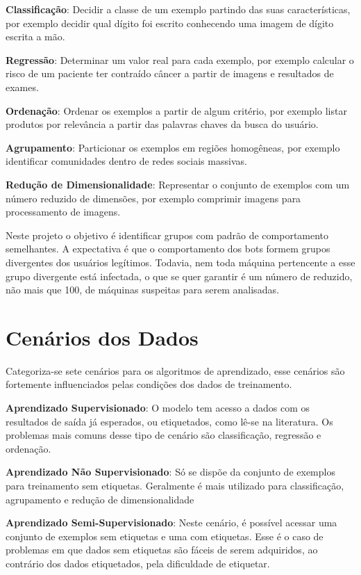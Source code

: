 \begin{description}
\item \textbf{Classificação}: Decidir a classe de um exemplo partindo das suas características, por exemplo decidir qual dígito foi escrito conhecendo uma imagem de dígito escrita a mão.
\item \textbf{Regressão}: Determinar um valor real para cada exemplo, por exemplo calcular o risco de um paciente ter contraído câncer a partir de imagens e resultados de exames.
\item \textbf{Ordenação}: Ordenar os exemplos a partir de algum critério, por exemplo listar produtos por relevância a partir das palavras chaves da busca do usuário.
\item \textbf{Agrupamento}: Particionar os exemplos em regiões homogêneas, por exemplo identificar comunidades dentro de redes sociais massivas.
\item \textbf{Redução de Dimensionalidade}: Representar o conjunto de exemplos com um número reduzido de dimensões, por exemplo comprimir imagens para processamento de imagens.
\end{description}

Neste projeto o objetivo é identificar grupos com padrão de comportamento semelhantes. A expectativa é que o comportamento dos bots formem grupos divergentes dos usuários legítimos. Todavia, nem toda máquina pertencente a esse grupo divergente está infectada, o que se quer garantir é um número de reduzido, não mais que 100, de máquinas suspeitas para serem analisadas.

\section{Cenários dos Dados}

Categoriza-se \citep{mohri2012foundations} sete cenários para os algoritmos de aprendizado, esse cenários são fortemente influenciados pelas condições dos dados de treinamento.

\begin{description}
\item \textbf{Aprendizado Supervisionado}: O modelo tem acesso a dados com os resultados de saída já esperados, ou etiquetados, como lê-se na literatura. Os problemas mais comuns desse tipo de cenário são classificação, regressão e ordenação.

\item \textbf{Aprendizado Não Supervisionado}: Só se dispõe da conjunto de exemplos para treinamento sem etiquetas. Geralmente é mais utilizado para classificação, agrupamento e redução de dimensionalidade

\item \textbf{Aprendizado Semi-Supervisionado}: Neste cenário, é possível acessar uma conjunto de exemplos sem etiquetas e uma com etiquetas. Esse é o caso de problemas em que dados sem etiquetas são fáceis de serem adquiridos, ao contrário dos dados etiquetados, pela dificuldade de etiquetar.

\end{description}

